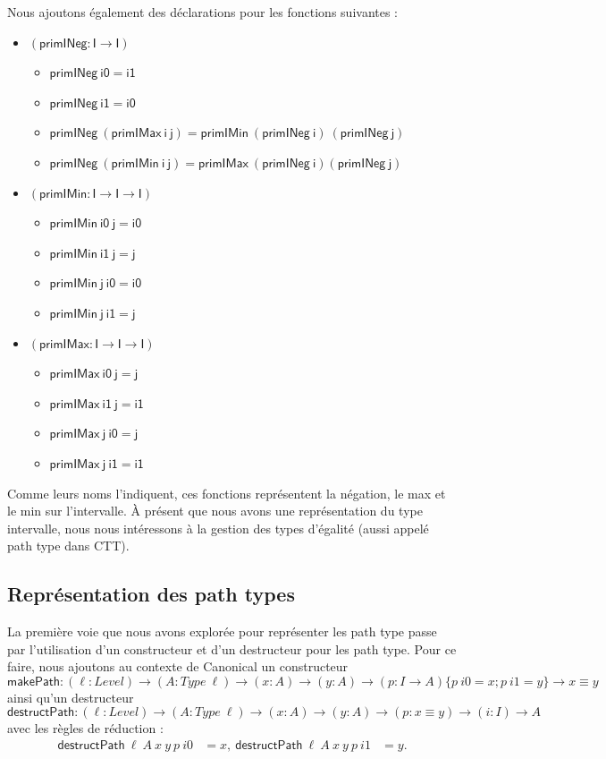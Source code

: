 \documentclass[11pt]{article}
\begin{document}
Nous ajoutons également des déclarations pour les fonctions suivantes :
\begin{itemize}
  \item $\mathsf{(primINeg : I \to I)}$
    \begin{itemize}
      \item $\mathsf{primINeg~i0 = i1}$ 
      \item $\mathsf{primINeg~i1 = i0}$
      \item $\mathsf{primINeg~(primIMax~i~j) = primIMin~(primINeg~i)~(primINeg~j)}$ 
      \item $\mathsf{primINeg~(primIMin~i~j) = primIMax~(primINeg~i) (primINeg~j)}$ 
    \end{itemize}
  \item $\mathsf{(primIMin : I \to I \to I)}$
    \begin{itemize}
      \item $\mathsf{primIMin~i0~j = i0}$ 
      \item $\mathsf{primIMin~i1~j = j}$ 
      \item $\mathsf{primIMin~j~i0 = i0} $
      \item $\mathsf{primIMin~j~i1 = j}$ 
    \end{itemize}
  \item $\mathsf{(primIMax : I \to I \to I)}$
    \begin{itemize}
      \item $\mathsf{primIMax~i0~j = j}$ 
      \item $\mathsf{primIMax~i1~j = i1}$ 
      \item $\mathsf{primIMax~j~i0 = j} $
      \item $\mathsf{primIMax~j~i1 = i1}$ 
    \end{itemize}
\end{itemize}
Comme leurs noms l'indiquent, ces fonctions représentent la négation, le max et le min sur l'intervalle.
À présent que nous avons une représentation du type intervalle, 
nous nous intéressons à la gestion des types d'égalité (aussi appelé path type dans CTT).

\subsection{Représentation des path types}
La première voie que nous avons explorée pour représenter les path type passe par l'utilisation d'un constructeur et
d'un destructeur pour les path type.
Pour ce faire, nous ajoutons au contexte de Canonical un constructeur
\[
\mathsf{makePath} :
(\ell : Level) \to
(A : Type\ \ell) \to
(x : A) \to
(y : A) \to
(p : I \to A)
\{p~i0 = x; p~i1 = y\}
\to x \equiv y
\]
ainsi qu'un destructeur
\[
\mathsf{destructPath} :
(\ell : Level) \to
(A : Type\ \ell) \to
(x : A) \to
(y : A) \to
(p : x \equiv y) \to
(i : I) \to A
\]
avec les règles de réduction :
\[
\begin{aligned}
\mathsf{destructPath}\ \ell\ A\ x\ y\ p\ i0 &= x,\
\mathsf{destructPath}\ \ell\ A\ x\ y\ p\ i1 &= y.
\end{aligned}
\]
\end{document}
